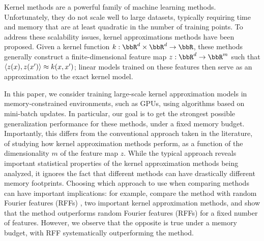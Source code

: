 Kernel methods are a powerful family of machine learning methods.  Unfortunately, they do not scale well to large datasets, typically requiring time and memory that are at least quadratic in the number of training points. To address these scalability issues, kernel approximations methods have been proposed. Given a kernel function $k:\RR^d\times\RR^d\rightarrow \RR$, these methods generally construct a finite-dimensional feature map $z: \RR^d \rightarrow \RR^m$ such that $\langle z(x),z(x') \rangle \approx k(x,x')$; linear models trained on these features then serve as an approximation to the exact kernel model. 

In this paper, we consider training large-scale kernel approximation models in memory-constrained environments, such as GPUs, using algorithms based on mini-batch updates. In particular, our goal is to get the strongest possible generalization performance for these methods, under a fixed memory budget.  Importantly, this differs from the conventional approach taken in the literature, of studying how kernel approximation methods perform, as a function of the dimensionality $m$ of the feature map $z$. While the typical approach reveals important statistical properties of the kernel approximation methods being analyzed, it ignores the fact that different methods can have drastically different memory footprints. Choosing which approach to use when comparing methods can have important implications: for example, \citet{nysvsrff12} compare the \Nystrom method \citep{nystrom} with random Fourier features (RFFs) \citep{rahimi07random}, two important kernel approximation methods, and show that the \Nystrom method \citep{nystrom} outperforms random Fourier features (RFFs) \citep{rahimi07random} for a fixed number of features.  However, we observe that the opposite is true under a memory budget, with RFF systematically outperforming the \Nystrom method. 



